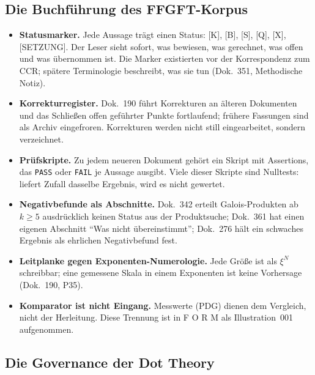 \subsection{Die Buchführung des FFGFT-Korpus}

\begin{itemize}
\item \textbf{Statusmarker.} Jede Aussage trägt einen Status: {[K]}, {[B]}, {[S]}, {[Q]},
  {[X]}, {[SETZUNG]}. Der Leser sieht sofort, was bewiesen, was gerechnet, was offen und
  was übernommen ist. Die Marker existierten vor der Korrespondenz zum CCR; spätere
  Terminologie beschreibt, was sie tun (Dok.~351, Methodische Notiz).
\item \textbf{Korrekturregister.} Dok.~190 führt Korrekturen an älteren Dokumenten und das
  Schließen offen geführter Punkte fortlaufend; frühere Fassungen sind als Archiv
  eingefroren. Korrekturen werden nicht still eingearbeitet, sondern verzeichnet.
\item \textbf{Prüfskripte.} Zu jedem neueren Dokument gehört ein Skript mit Assertions,
  das \texttt{PASS} oder \texttt{FAIL} je Aussage ausgibt. Viele dieser Skripte sind
  Nulltests: liefert Zufall dasselbe Ergebnis, wird es nicht gewertet.
\item \textbf{Negativbefunde als Abschnitte.} Dok.~342 erteilt Galois-Produkten ab $k\ge5$
  ausdrücklich keinen Status aus der Produktsuche; Dok.~361 hat einen eigenen Abschnitt
  \enquote{Was nicht übereinstimmt}; Dok.~276 hält ein schwaches Ergebnis als ehrlichen
  Negativbefund fest.
\item \textbf{Leitplanke gegen Exponenten-Numerologie.} Jede Größe ist als $\xi^N$
  schreibbar; eine gemessene Skala in einem Exponenten ist keine Vorhersage (Dok.~190, P35).
\item \textbf{Komparator ist nicht Eingang.} Messwerte (PDG) dienen dem Vergleich, nicht
  der Herleitung. Diese Trennung ist in F O R M als Illustration~001 aufgenommen.
\end{itemize}

\subsection{Die Governance der Dot Theory}

